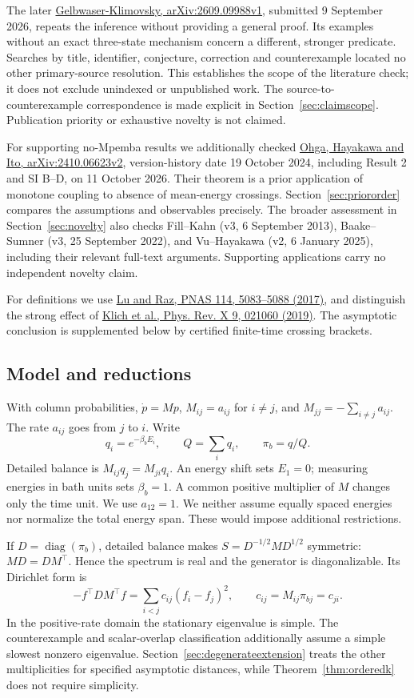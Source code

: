 \documentclass[11pt]{article}
\newcommand{\diag}{\operatorname{diag}}
\begin{document}
The later \href{https://arxiv.org/html/2609.09988v1}{Gelbwaser-Klimovsky, arXiv:2609.09988v1}, submitted 9 September 2026, repeats the inference without providing a general proof. Its examples without an exact three-state mechanism concern a different, stronger predicate. Searches by title, identifier, conjecture, correction and counterexample located no other primary-source resolution. This establishes the scope of the literature check; it does not exclude unindexed or unpublished work. The source-to-counterexample correspondence is made explicit in Section~\ref{sec:claimscope}. Publication priority or exhaustive novelty is not claimed.

For supporting no-Mpemba results we additionally checked \href{https://arxiv.org/html/2410.06623v2}{Ohga, Hayakawa and Ito, arXiv:2410.06623v2}, version-history date 19 October 2024, including Result 2 and SI B--D, on 11 October 2026. Their theorem is a prior application of monotone coupling to absence of mean-energy crossings. Section~\ref{sec:priororder} compares the assumptions and observables precisely. The broader assessment in Section~\ref{sec:novelty} also checks Fill--Kahn (v3, 6 September 2013), Baake--Sumner (v3, 25 September 2022), and Vu--Hayakawa (v2, 6 January 2025), including their relevant full-text arguments. Supporting applications carry no independent novelty claim.

For definitions we use \href{https://pmc.ncbi.nlm.nih.gov/articles/PMC5441807/}{Lu and Raz, PNAS 114, 5083--5088 (2017)}, and distinguish the strong effect of \href{https://arxiv.org/abs/1711.05829}{Klich et al., Phys. Rev. X 9, 021060 (2019)}. The asymptotic conclusion is supplemented below by certified finite-time crossing brackets.

\subsection{Model and reductions}
With column probabilities, $\dot p=Mp$, $M_{ij}=a_{ij}$ for $i\ne j$, and $M_{jj}=-\sum_{i\ne j}a_{ij}$. The rate $a_{ij}$ goes from $j$ to $i$. Write
\[
q_i=e^{-\beta_b E_i},\qquad Q=\sum_iq_i,\qquad \pi_b=q/Q.
\]
Detailed balance is $M_{ij}q_j=M_{ji}q_i$. An energy shift sets $E_1=0$; measuring energies in bath units sets $\beta_b=1$. A common positive multiplier of $M$ changes only the time unit. We use $a_{12}=1$. We neither assume equally spaced energies nor normalize the total energy span. These would impose additional restrictions.

If $D=\diag(\pi_b)$, detailed balance makes $S=D^{-1/2}MD^{1/2}$ symmetric: $MD=DM^\top$. Hence the spectrum is real and the generator is diagonalizable. Its Dirichlet form is
\[
-f^\top D M^\top f=\sum_{i<j}c_{ij}(f_i-f_j)^2,\qquad c_{ij}=M_{ij}\pi_{bj}=c_{ji}.
\]
In the positive-rate domain the stationary eigenvalue is simple. The counterexample and scalar-overlap classification additionally assume a simple slowest nonzero eigenvalue. Section~\ref{sec:degenerateextension} treats the other multiplicities for specified asymptotic distances, while Theorem~\ref{thm:orderedk} does not require simplicity.
\end{document}
